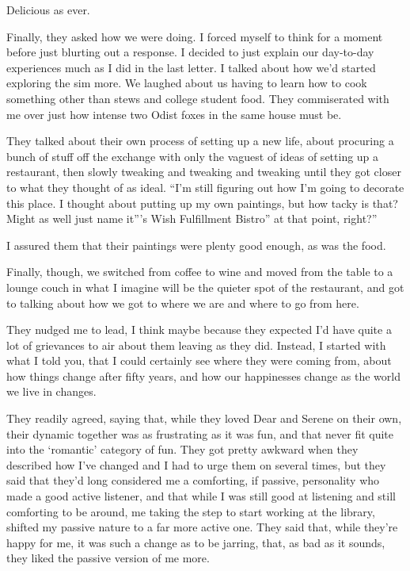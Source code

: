 Delicious as ever.

Finally, they asked how we were doing. I forced myself to think for a moment before just blurting out a response. I decided to just explain our day-to-day experiences much as I did in the last letter. I talked about how we'd started exploring the sim more. We laughed about us having to learn how to cook something other than stews and college student food. They commiserated with me over just how intense two Odist foxes in the same house must be.

They talked about their own process of setting up a new life, about procuring a bunch of stuff off the exchange with only the vaguest of ideas of setting up a restaurant, then slowly tweaking and tweaking and tweaking until they got closer to what they thought of as ideal. ``I'm still figuring out how I'm going to decorate this place. I thought about putting up my own paintings, but how tacky is that? Might as well just name it''\Partner 's Wish Fulfillment Bistro'' at that point, right?''

I assured them that their paintings were plenty good enough, as was the food.

Finally, though, we switched from coffee to wine and moved from the table to a lounge couch in what I imagine will be the quieter spot of the restaurant, and got to talking about how we got to where we are and where to go from here.

They nudged me to lead, I think maybe because they expected I'd have quite a lot of grievances to air about them leaving as they did. Instead, I started with what I told you, that I could certainly see where they were coming from, about how things change after fifty years, and how our happinesses change as the world we live in changes.

They readily agreed, saying that, while they loved Dear and Serene on their own, their dynamic together was as frustrating as it was fun, and that never fit quite into the `romantic' category of fun. They got pretty awkward when they described how I've changed and I had to urge them on several times, but they said that they'd long considered me a comforting, if passive, personality who made a good active listener, and that while I was still good at listening and still comforting to be around, me taking the step to start working at the library, shifted my passive nature to a far more active one. They said that, while they're happy for me, it was such a change as to be jarring, that, as bad as it sounds, they liked the passive version of me more.


